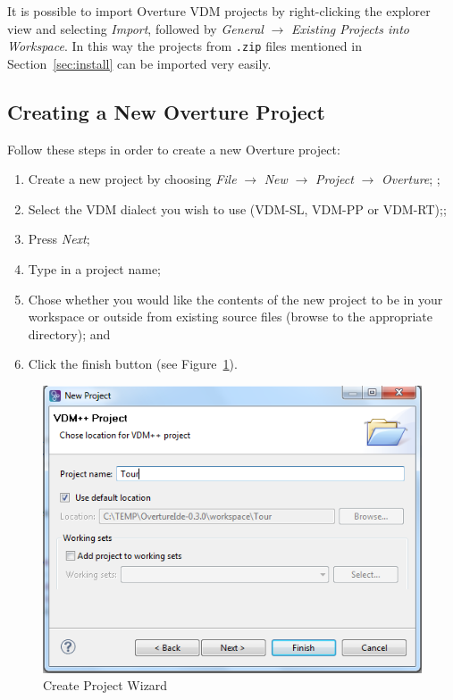 \documentclass{overturerep}
\begin{document}
{It is possible to import Overture VDM projects by
right-clicking the explorer view and selecting \emph{Import}, followed
by \emph{General} $\rightarrow$ \emph{Existing Projects into
  Workspace}.  In this way the projects from \texttt{.zip} files
mentioned in Section~\ref{sec:install} can be imported very
easily.  

\subsection{Creating a New Overture Project}

Follow these steps in order to create a new Overture project:

\begin{enumerate}
	\item Create a new project by choosing \emph{File}
          $\rightarrow$ \emph{New} $\rightarrow$ \emph{Project}
          $\rightarrow$ \emph{Overture}; ;
	\item Select the VDM dialect you wish to use (VDM-SL, VDM-PP
          or VDM-RT);;
	\item Press \emph{Next};
         \item Type in a project name;
	\item Chose whether you would like the contents of the new
          project to be in your workspace or outside from existing
          source files (browse to the appropriate directory); and
         \item Click
	the finish button (see Figure~\ref{fig:CreateProjectWizard}).
\end{enumerate}

\begin{figure}[!htb]
	\begin{center}
	  \includegraphics[scale=0.8]{figures/CreateProjectWizard}
	  \caption[Create Project Wizard]{Create Project Wizard}
	  \label{fig:CreateProjectWizard}
	\end{center}
\end{figure}

}
\end{document}
